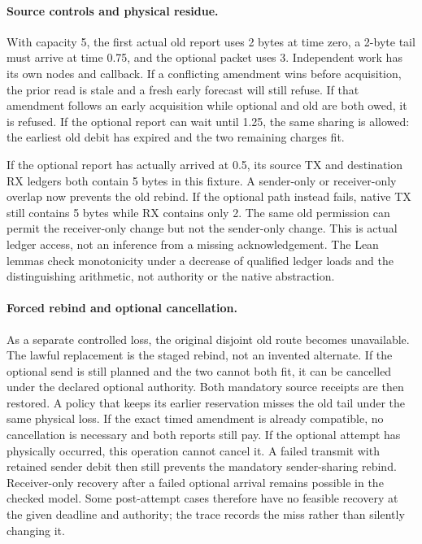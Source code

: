 \documentclass[11pt]{article}
\begin{document}
\paragraph{Source controls and physical residue.}
With capacity 5, the first actual old report uses 2 bytes at time
zero, a 2-byte tail must arrive at time 0.75, and the optional
packet uses 3. Independent work has its own nodes and callback.
If a conflicting amendment wins before acquisition, the prior
read is stale and a fresh early forecast will still refuse.
If that amendment follows an early acquisition while optional
and old are both owed, it is refused. If the optional report can
wait until 1.25, the same sharing is allowed: the earliest old
debit has expired and the two remaining charges fit.

If the optional report has actually arrived at 0.5, its source
TX and destination RX ledgers both contain 5 bytes in this fixture.
A sender-only or receiver-only overlap now prevents the old rebind.
If the optional path instead fails, native TX still contains 5
bytes while RX contains only 2. The same old permission can permit
the receiver-only change but not the sender-only change. This is
actual ledger access, not an inference from a missing acknowledgement.
The Lean lemmas check monotonicity under a decrease of qualified
ledger loads and the distinguishing arithmetic, not authority or
the native abstraction.

\paragraph{Forced rebind and optional cancellation.}
As a separate controlled loss, the original disjoint old route
becomes unavailable. The lawful replacement is the staged rebind,
not an invented alternate. If the optional send is still planned
and the two cannot both fit, it can be cancelled under the declared
optional authority. Both mandatory source receipts are then restored.
A policy that keeps its earlier reservation misses the old tail
under the same physical loss. If the exact timed amendment is
already compatible, no cancellation is necessary and both reports
still pay. If the optional attempt has physically occurred, this
operation cannot cancel it. A failed transmit with retained sender
debit then still prevents the mandatory sender-sharing rebind.
Receiver-only recovery after a failed optional arrival remains
possible in the checked model. Some post-attempt cases therefore
have no feasible recovery at the given deadline and authority;
the trace records the miss rather than silently changing it.
\end{document}
